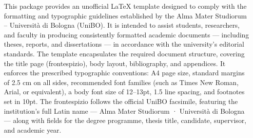 This package provides an unofficial LaTeX template designed to comply with the formatting and typographic guidelines established by the Alma Mater Studiorum – Università di Bologna (UniBO). It is intended to assist students, researchers, and faculty in producing consistently formatted academic documents — including theses, reports, and dissertations — in accordance with the university's editorial standards.
The template encapsulates the required document structure, covering the title page (frontespizio), body layout, bibliography, and appendices. It enforces the prescribed typographic conventions: A4 page size, standard margins of 2.5 cm on all sides, recommended font families (such as Times New Roman, Arial, or equivalent), a body font size of 12–13pt, 1.5 line spacing, and footnotes set in 10pt. The frontespizio follows the official UniBO facsimile, featuring the institution's full Latin name — Alma Mater Studiorum · Università di Bologna — along with fields for the degree programme, thesis title, candidate, supervisor, and academic year.